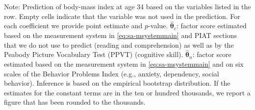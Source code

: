 \documentclass[static]{JJH-Beamer}
\begin{document}
\begin{frame}
\begin{table}[H]
\begin{center}
\end{center}
\tiny \flushleft
Note: Prediction of body-mass index at age 34 based on the variables listed in the row. Empty cells indicate that the variable was not used in the prediction. For each coefficient we provide point estimate and $p$-value. $\hat{\bm{\theta}}_{c}$: factor score estimated based on the measurement system in \eqref{eq:sa-msystemmain} and PIAT sections that we do not use to predict (reading and comprehension) as well as by the Peabody Picture Vocabulary Test (PPVT) (cognitive skill). $\hat{\bm{\theta}}_{n}$: factor score estimated based on the measurement system in \eqref{eq:sa-msystemmain} and on six scales of the Behavior Problems Index (e.g., anxiety, dependency, social behavior). Inference is based on the empirical bootstrap distribution. If the estimates for the constant terms are in the ten or hundred thousands, we report a figure that has been rounded to the thousands.\\
\end{table}

\end{frame}
\end{document}
